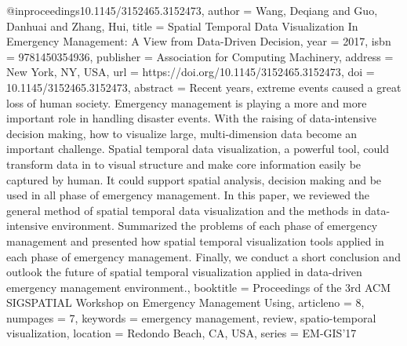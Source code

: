 @inproceedings{10.1145/3152465.3152473,
author = {Wang, Deqiang and Guo, Danhuai and Zhang, Hui},
title = {Spatial Temporal Data Visualization In Emergency Management: A View from Data-Driven Decision},
year = {2017},
isbn = {9781450354936},
publisher = {Association for Computing Machinery},
address = {New York, NY, USA},
url = {https://doi.org/10.1145/3152465.3152473},
doi = {10.1145/3152465.3152473},
abstract = {Recent years, extreme events caused a great loss of human society. Emergency management is playing a more and more important role in handling disaster events. With the raising of data-intensive decision making, how to visualize large, multi-dimension data become an important challenge. Spatial temporal data visualization, a powerful tool, could transform data in to visual structure and make core information easily be captured by human. It could support spatial analysis, decision making and be used in all phase of emergency management. In this paper, we reviewed the general method of spatial temporal data visualization and the methods in data-intensive environment. Summarized the problems of each phase of emergency management and presented how spatial temporal visualization tools applied in each phase of emergency management. Finally, we conduct a short conclusion and outlook the future of spatial temporal visualization applied in data-driven emergency management environment.},
booktitle = {Proceedings of the 3rd ACM SIGSPATIAL Workshop on Emergency Management Using},
articleno = {8},
numpages = {7},
keywords = {emergency management, review, spatio-temporal visualization},
location = {Redondo Beach, CA, USA},
series = {EM-GIS'17}
}
